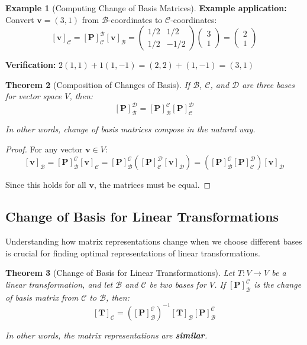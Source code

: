 \documentclass[12pt]{article}
\numberwithin{equation}{section}
\newcommand{\vect}[1]{\boldsymbol{#1}}   %
\newcommand{\mat}[1]{\mathbf{#1}}        %
\theoremstyle{plain}
\newtheorem{theorem}{Theorem}[section]
\theoremstyle{definition}
\newtheorem{example}[theorem]{Example}
\theoremstyle{remark}
\begin{document}
\begin{example}[Computing Change of Basis Matrices]
\textbf{Example application:}
Convert $\vect{v} = (3, 1)$ from $\mathcal{B}$-coordinates to $\mathcal{C}$-coordinates:
$$[\vect{v}]_{\mathcal{C}} = [\mat{P}]_{\mathcal{C}}^{\mathcal{B}} [\vect{v}]_{\mathcal{B}} = \begin{pmatrix} 1/2 & 1/2 \\ 1/2 & -1/2 \end{pmatrix}\begin{pmatrix} 3 \\ 1 \end{pmatrix} = \begin{pmatrix} 2 \\ 1 \end{pmatrix}$$

\textbf{Verification:} $2(1,1) + 1(1,-1) = (2,2) + (1,-1) = (3,1)$ \checkmark
\end{example}

\begin{theorem}[Composition of Changes of Basis]
If $\mathcal{B}$, $\mathcal{C}$, and $\mathcal{D}$ are three bases for vector space $V$, then:
$$[\mat{P}]_{\mathcal{B}}^{\mathcal{D}} = [\mat{P}]_{\mathcal{B}}^{\mathcal{C}} [\mat{P}]_{\mathcal{C}}^{\mathcal{D}}$$

In other words, change of basis matrices compose in the natural way.
\end{theorem}

\begin{proof}
For any vector $\vect{v} \in V$:
$$[\vect{v}]_{\mathcal{B}} = [\mat{P}]_{\mathcal{B}}^{\mathcal{C}} [\vect{v}]_{\mathcal{C}} = [\mat{P}]_{\mathcal{B}}^{\mathcal{C}} ([\mat{P}]_{\mathcal{C}}^{\mathcal{D}} [\vect{v}]_{\mathcal{D}}) = ([\mat{P}]_{\mathcal{B}}^{\mathcal{C}} [\mat{P}]_{\mathcal{C}}^{\mathcal{D}}) [\vect{v}]_{\mathcal{D}}$$

Since this holds for all $\vect{v}$, the matrices must be equal.
\end{proof}

\subsection{Change of Basis for Linear Transformations}

Understanding how matrix representations change when we choose different bases is crucial for finding optimal representations of linear transformations.

\begin{theorem}[Change of Basis for Linear Transformations]
Let $T: V \to V$ be a linear transformation, and let $\mathcal{B}$ and $\mathcal{C}$ be two bases for $V$. If $[\mat{P}]_{\mathcal{B}}^{\mathcal{C}}$ is the change of basis matrix from $\mathcal{C}$ to $\mathcal{B}$, then:
$$[\mat{T}]_{\mathcal{C}} = ([\mat{P}]_{\mathcal{B}}^{\mathcal{C}})^{-1} [\mat{T}]_{\mathcal{B}} [\mat{P}]_{\mathcal{B}}^{\mathcal{C}}$$

In other words, the matrix representations are \textbf{similar}.
\end{theorem}
\end{document}
